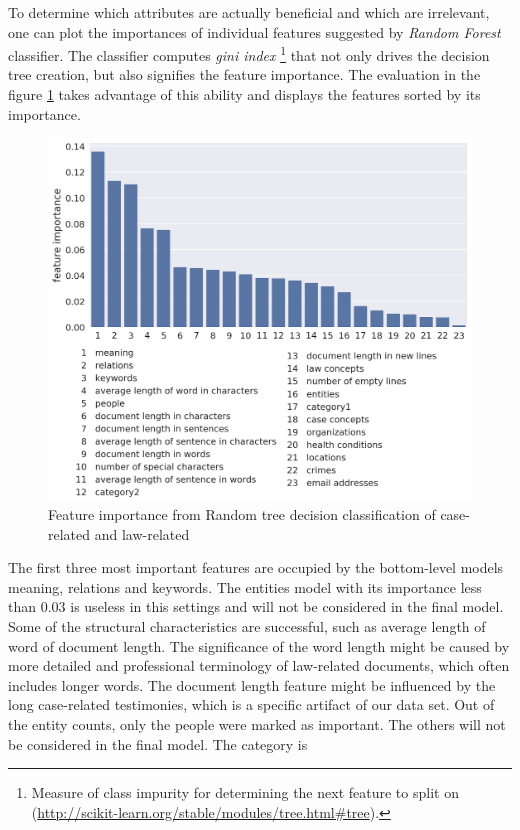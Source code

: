 \documentclass[
  digital, %
  table,   %
  lof,     %
  lot,     %
]{fithesis3}
\begin{document}
To determine which attributes are actually beneficial and which are irrelevant, one can plot the importances of individual features suggested by \textit{Random Forest} classifier.
The classifier computes \textit{gini index} \footnote{Measure of class impurity for determining the next feature to split on \\(\url{http://scikit-learn.org/stable/modules/tree.html\#tree}).} that not only drives the decision tree creation, but also signifies the feature importance.
The evaluation in the figure \ref{fig:case_law_feature_importance} takes advantage of this ability and displays the features sorted by its importance.

\begin{figure}[h]
\caption{Feature importance from Random tree decision classification of case-related and law-related}
\label{fig:case_law_feature_importance}
\includegraphics[width=\textwidth]{img/case_law_feature_importance}
\end{figure}

The first three most important features are occupied by the bottom-level models meaning, relations and keywords.
The entities model with its importance less than $0.03$ is useless in this settings and will not be considered in the final model.
Some of the structural characteristics are successful, such as average length of word of document length.
The significance of the word length might be caused by more detailed and professional terminology of law-related documents, which often includes longer words.
The document length feature might be influenced by the long case-related testimonies, which is a specific artifact of our data set.
Out of the entity counts, only the people were marked as important.
The others will not be considered in the final model.
The category is 
\end{document}
